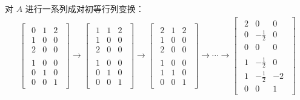 \begin{solve}
	对 $A$ 进行一系列成对初等行列变换：
	$$
	\begin{gathered}
		\left[
		\begin{array}{c}
			\begin{matrix} 0 & 1 & 2 \\ 1 & 0 & 0 \\ 2 & 0 & 0 \end{matrix}
			\\\hline
			\begin{matrix} 1 & 0 & 0 \\ 0 & 1 & 0 \\ 0 & 0 & 1 \end{matrix}
		\end{array}
		\right]
		\to
		\left[
		\begin{array}{c}
			\begin{matrix} 1 & 1 & 2 \\ 1 & 0 & 0 \\ 2 & 0 & 0 \end{matrix}
			\\\hline
			\begin{matrix} 1 & 0 & 0 \\ 0 & 1 & 0 \\ 0 & 0 & 1 \end{matrix}
		\end{array}
		\right]
		\to
		\left[
		\begin{array}{c}
			\begin{matrix} 2 & 1 & 2 \\ 1 & 0 & 0 \\ 2 & 0 & 0 \end{matrix}
			\\\hline
			\begin{matrix} 1 & 0 & 0 \\ 1 & 1 & 0 \\ 0 & 0 & 1 \end{matrix}
		\end{array}
		\right]
		\to \cdots \to
		\left[
		\begin{array}{c}
			\begin{matrix} 2 & 0 & 0 \\ 0 & -\frac{1}{2} & 0 \\ 0 & 0 & 0 \end{matrix}
			\\\hline
			\begin{matrix} 1 & -\frac{1}{2} & 0 \\ 1 & -\frac{1}{2} & -2 \\ 0 & 0 & 1 \end{matrix}
		\end{array}
		\right]
	\end{gathered}
	$$


\end{solve}

